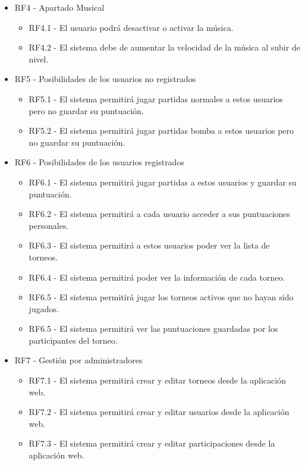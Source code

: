 \documentclass{article}
\begin{document}
\begin{itemize}
    \item RF4 - Apartado Musical
    \begin{itemize}
      \item RF4.1 - El usuario podrá desactivar o activar la música.
      \item RF4.2 - El sistema debe de aumentar la velocidad de la música al subir de nivel.
    \end{itemize}

     \item RF5 - Posibilidades de los usuarios no registrados
     \begin{itemize}
      \item RF5.1 - El sistema permitirá jugar partidas normales a estos usuarios pero no guardar su puntuación.
      \item RF5.2 - El sistema permitirá jugar partidas bomba a estos usuarios pero no guardar su puntuación.
    \end{itemize}

    \item RF6 - Posibilidades de los usuarios registrados
     \begin{itemize}
      \item RF6.1 - El sistema permitirá jugar partidas a estos usuarios y guardar su puntuación.
      \item RF6.2 - El sistema permitirá a cada usuario acceder a sus puntuaciones personales.
      \item RF6.3 - El sistema permitirá a estos usuarios poder ver la lista de torneos.
      \item RF6.4 - El sistema permitirá poder ver la información de cada torneo.
      \item RF6.5 - El sistema permitirá jugar los torneos activos que no hayan sido jugados.
      \item RF6.5 - El sistema permitirá ver las puntuaciones guardadas por los participantes del torneo.
      
    \end{itemize}

    \item RF7 - Gestión por administradores
    \begin{itemize}
      \item RF7.1 - El sistema permitirá crear y editar torneos desde la aplicación web.
      \item RF7.2 - El sistema permitirá crear y editar usuarios desde la aplicación web.
      \item RF7.3 - El sistema permitirá crear y editar participaciones desde la aplicación web.


\end{itemize}
\end{itemize}
\end{document}
